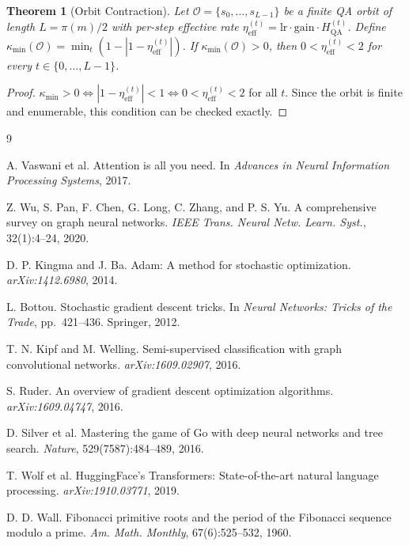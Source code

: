 \documentclass[11pt]{article}
\newtheorem{theorem}{Theorem}[section]
\theoremstyle{definition}
\theoremstyle{remark}
\newcommand{\hqa}{H_{\mathrm{QA}}}
\newcommand{\etaeff}{\eta_{\mathrm{eff}}}
\newcommand{\kmin}{\kappa_{\min}}
\begin{document}
\begin{theorem}[Orbit Contraction]
Let $\mathcal{O}=\{s_0,\ldots,s_{L-1}\}$ be a finite QA orbit of length $L=\pi(m)/2$
with per-step effective rate $\etaeff^{(t)}=\mathrm{lr}\cdot\mathrm{gain}\cdot\hqa^{(t)}$.
Define $\kmin(\mathcal{O})=\min_t(1-|1-\etaeff^{(t)}|)$.
If $\kmin(\mathcal{O})>0$, then $0<\etaeff^{(t)}<2$ for every $t\in\{0,\ldots,L-1\}$.
\end{theorem}
\begin{proof}
$\kmin>0\Leftrightarrow|1-\etaeff^{(t)}|<1\Leftrightarrow 0<\etaeff^{(t)}<2$ for all $t$.
Since the orbit is finite and enumerable, this condition can be checked exactly.
\end{proof}


\begin{thebibliography}{9}

A. Vaswani et al.
\newblock Attention is all you need.
\newblock In \textit{Advances in Neural Information Processing Systems}, 2017.

Z. Wu, S. Pan, F. Chen, G. Long, C. Zhang, and P. S. Yu.
\newblock A comprehensive survey on graph neural networks.
\newblock \textit{IEEE Trans. Neural Netw. Learn. Syst.}, 32(1):4--24, 2020.

D. P. Kingma and J. Ba.
\newblock Adam: A method for stochastic optimization.
\newblock \textit{arXiv:1412.6980}, 2014.

L. Bottou.
\newblock Stochastic gradient descent tricks.
\newblock In \textit{Neural Networks: Tricks of the Trade}, pp.~421--436. Springer, 2012.

T. N. Kipf and M. Welling.
\newblock Semi-supervised classification with graph convolutional networks.
\newblock \textit{arXiv:1609.02907}, 2016.

S. Ruder.
\newblock An overview of gradient descent optimization algorithms.
\newblock \textit{arXiv:1609.04747}, 2016.

D. Silver et al.
\newblock Mastering the game of Go with deep neural networks and tree search.
\newblock \textit{Nature}, 529(7587):484--489, 2016.

T. Wolf et al.
\newblock HuggingFace's Transformers: State-of-the-art natural language processing.
\newblock \textit{arXiv:1910.03771}, 2019.

D. D. Wall.
\newblock Fibonacci primitive roots and the period of the Fibonacci sequence modulo a prime.
\newblock \textit{Am. Math. Monthly}, 67(6):525--532, 1960.

\end{thebibliography}
\end{document}
